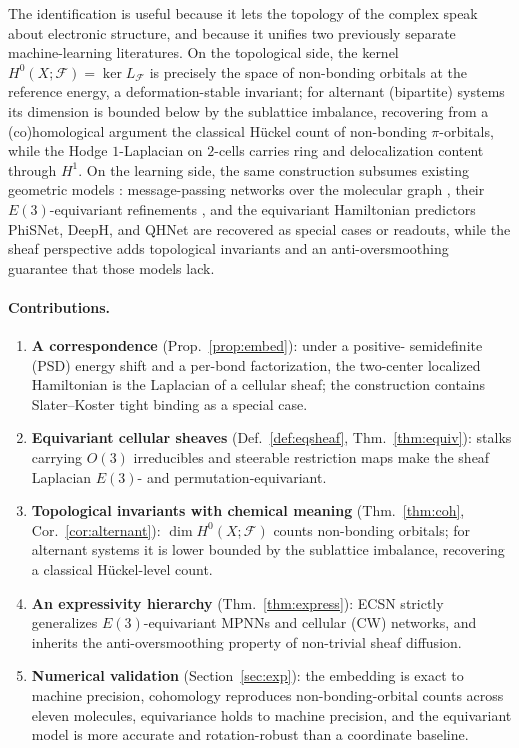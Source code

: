 \documentclass[pdflatex,sn-mathphys-num]{sn-jnl}%
\newcommand{\F}{\mathcal{F}}
\newcommand{\X}{X}
\theoremstyle{thmstyleone}
\theoremstyle{thmstyletwo}
\theoremstyle{thmstylethree}
\begin{document}
The identification is useful because it lets the topology of the complex speak
about electronic structure, and because it unifies two previously separate
machine-learning literatures. On the topological side, the kernel
$H^0(\X;\F)=\ker L_\F$ is precisely the space of non-bonding orbitals at the
reference energy, a deformation-stable invariant; for alternant (bipartite)
systems its dimension is bounded below by the sublattice imbalance, recovering
from a (co)homological argument the classical H\"uckel count of non-bonding
$\pi$-orbitals, while the Hodge $1$-Laplacian on $2$-cells carries ring and
delocalization content through $H^1$. On the learning side, the same
construction subsumes existing geometric models \cite{bronstein2021}:
message-passing networks over the molecular graph \cite{gilmer2017,schnet},
their $E(3)$-equivariant refinements \cite{tfn,nequip,mace}, and the equivariant
Hamiltonian predictors PhiSNet, DeepH, and QHNet \cite{phisnet,deeph,qhnet} are
recovered as special cases or readouts, while the sheaf perspective adds
topological invariants and an anti-oversmoothing guarantee that those models
lack.

\paragraph{Contributions.}
\begin{enumerate}[leftmargin=1.4em,itemsep=2pt]
\item \textbf{A correspondence} (Prop.~\ref{prop:embed}): under a positive-
semidefinite (PSD) energy shift and a per-bond factorization, the two-center
localized Hamiltonian is the Laplacian of a cellular sheaf; the construction
contains Slater--Koster tight binding \cite{slaterkoster1954} as a special case.
\item \textbf{Equivariant cellular sheaves} (Def.~\ref{def:eqsheaf},
Thm.~\ref{thm:equiv}): stalks carrying $O(3)$ irreducibles and steerable
restriction maps make the sheaf Laplacian $E(3)$- and permutation-equivariant.
\item \textbf{Topological invariants with chemical meaning}
(Thm.~\ref{thm:coh}, Cor.~\ref{cor:alternant}): $\dim H^0(\X;\F)$ counts
non-bonding orbitals; for alternant systems it is lower bounded by the sublattice
imbalance, recovering a classical H\"uckel-level count.
\item \textbf{An expressivity hierarchy} (Thm.~\ref{thm:express}): ECSN strictly
generalizes $E(3)$-equivariant MPNNs and cellular (CW) networks, and inherits
the anti-oversmoothing property of non-trivial sheaf diffusion.
\item \textbf{Numerical validation} (Section~\ref{sec:exp}): the embedding is exact
to machine precision, cohomology reproduces non-bonding-orbital counts across
eleven molecules, equivariance holds to machine precision, and the equivariant
model is more accurate and rotation-robust than a coordinate baseline.
\end{enumerate}
\end{document}
